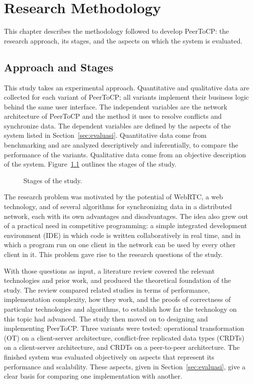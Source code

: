 \chapter{Research Methodology}
\label{bab:3}

This chapter describes the methodology followed to develop PeerToCP: the research approach, its stages, and the aspects on which the system is evaluated.

\section{Approach and Stages}
\label{sec:pendekatan}

This study takes an experimental approach. Quantitative and qualitative data are collected for each variant of PeerToCP; all variants implement their business logic behind the same user interface. The independent variables are the network architecture of PeerToCP and the method it uses to resolve conflicts and synchronize data. The dependent variables are defined by the aspects of the system listed in Section~\ref{sec:evaluasi}. Quantitative data come from benchmarking and are analyzed descriptively and inferentially, to compare the performance of the variants. Qualitative data come from an objective description of the system. Figure~\ref{bagan} outlines the stages of the study.

\begin{figure}[htbp]
    \centering
    
    \caption{Stages of the study.}
    \label{bagan}
\end{figure}

The research problem was motivated by the potential of WebRTC, a web technology, and of several algorithms for synchronizing data in a distributed network, each with its own advantages and disadvantages. The idea also grew out of a practical need in competitive programming: a simple integrated development environment (IDE) in which code is written collaboratively in real time, and in which a program run on one client in the network can be used by every other client in it. This problem gave rise to the research questions of the study.

With those questions as input, a literature review covered the relevant technologies and prior work, and produced the theoretical foundation of the study. The review compared related studies in terms of performance, implementation complexity, how they work, and the proofs of correctness of particular technologies and algorithms, to establish how far the technology on this topic had advanced. The study then moved on to designing and implementing PeerToCP. Three variants were tested: operational transformation (OT) on a client-server architecture, conflict-free replicated data types (CRDTs) on a client-server architecture, and CRDTs on a peer-to-peer architecture. The finished system was evaluated objectively on aspects that represent its performance and scalability. These aspects, given in Section~\ref{sec:evaluasi}, give a clear basis for comparing one implementation with another.

